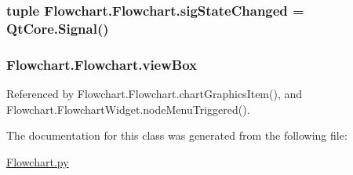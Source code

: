 \subsubsection[{sig\+State\+Changed}]{\setlength{\rightskip}{0pt plus 5cm}tuple Flowchart.\+Flowchart.\+sig\+State\+Changed = Qt\+Core.\+Signal()\hspace{0.3cm}{\ttfamily [static]}}\label{classFlowchart_1_1Flowchart_a37468c41e4a9ea99422bbe50ea36968a}
\hypertarget{classFlowchart_1_1Flowchart_a5886da9b4713cf5497afbfce97ae9053}{}
\subsubsection[{view\+Box}]{\setlength{\rightskip}{0pt plus 5cm}Flowchart.\+Flowchart.\+view\+Box}\label{classFlowchart_1_1Flowchart_a5886da9b4713cf5497afbfce97ae9053}


Referenced by Flowchart.\+Flowchart.\+chart\+Graphics\+Item(), and Flowchart.\+Flowchart\+Widget.\+node\+Menu\+Triggered().



The documentation for this class was generated from the following file\+:\begin{DoxyCompactItemize}
\item 
\hyperlink{Flowchart_8py}{Flowchart.\+py}\end{DoxyCompactItemize}
